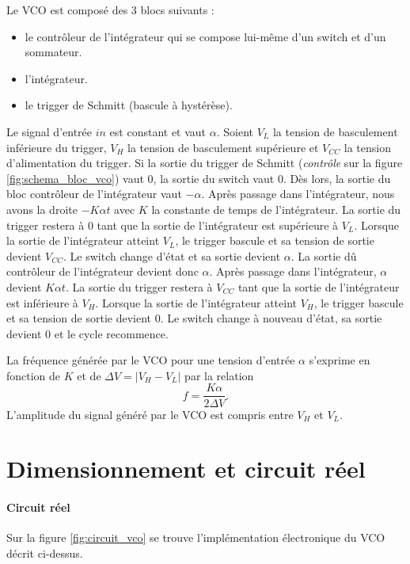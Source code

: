 Le VCO est composé des 3 blocs suivants :
\begin{itemize}
	\item le contrôleur de l'intégrateur qui se compose lui-même d'un switch et d'un sommateur.
	\item l'intégrateur.
	\item le trigger de Schmitt (bascule à hystérèse).
\end{itemize}

Le signal d'entrée $in$ est constant et vaut $\alpha$. Soient $V_L$ la
tension de basculement inférieure du trigger, $V_H$ la tension de 
basculement supérieure et $V_{CC}$ la tension d'alimentation du trigger.
Si la sortie du trigger de Schmitt (\textit{contrôle} sur la figure \ref{fig:schema_bloc_vco}) 
vaut $0$, la sortie du switch vaut $0$. Dès lors, la sortie du bloc contrôleur de l'intégrateur vaut $-\alpha$. Après passage dans l'intégrateur, nous avons la 
droite $-K\alpha t$ avec $K$ la constante de temps de l'intégrateur. La sortie du trigger
restera à $0$ tant que la sortie de l'intégrateur est supérieure à $V_L$. Lorsque la sortie
de l'intégrateur atteint $V_L$, le trigger bascule et sa tension de sortie devient $V_{CC}$. 
Le switch change d'état et sa sortie devient $\alpha$. La sortie dû contrôleur de l'intégrateur
devient donc $\alpha$. Après passage dans l'intégrateur, $\alpha$ devient $K\alpha t$. 
La sortie du trigger restera à $V_{CC}$ tant que la sortie de l'intégrateur est inférieure à $V_H$.
Lorsque la sortie de l'intégrateur atteint $V_H$, le trigger bascule et sa tension de sortie devient
$0$. Le switch change à nouveau d'état, sa sortie devient $0$ et le cycle recommence.

La fréquence générée par le VCO pour une tension d'entrée $\alpha$ s'exprime 
en fonction de $K$ et de $\Delta V = \vert V_H - V_L\vert $ par la relation 
\[ f = \frac{K\alpha}{2\Delta V}. \]
L'amplitude du signal généré par le VCO est compris entre $V_H$ et $V_L$.


\section{Dimensionnement et circuit réel}
\paragraph{Circuit réel}
Sur la figure \ref{fig:circuit_vco} se trouve l'implémentation électronique du VCO décrit ci-dessus.

